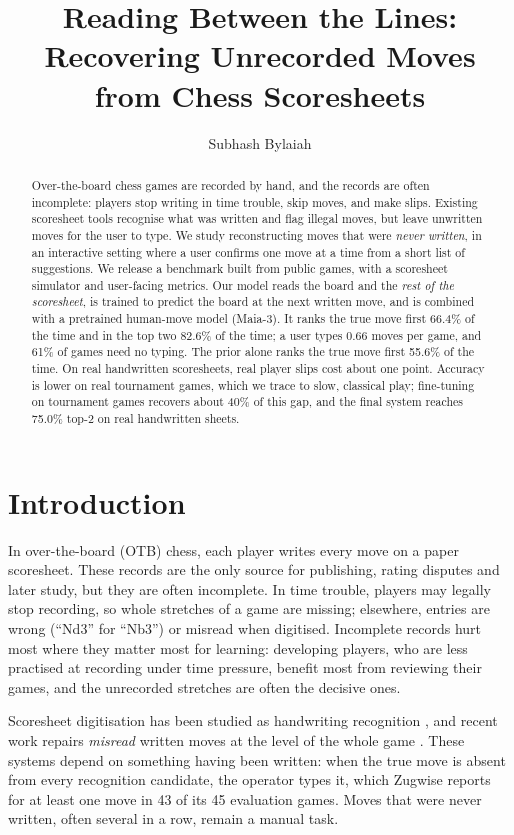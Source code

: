 \documentclass[11pt]{article}
\title{Reading Between the Lines:\\Recovering Unrecorded Moves from Chess Scoresheets}
\author{Subhash Bylaiah}
\date{}
\begin{document}
\maketitle

\begin{abstract}
Over-the-board chess games are recorded by hand, and the records are often incomplete: players stop writing in time trouble, skip moves, and make slips. Existing scoresheet tools recognise what was written and flag illegal moves, but leave unwritten moves for the user to type.
We study reconstructing moves that were \emph{never written}, in an interactive setting where a user confirms one move at a time from a short list of suggestions.
We release a benchmark built from public games, with a scoresheet simulator and user-facing metrics.
Our model reads the board and the \emph{rest of the scoresheet}, is trained to predict the board at the next written move, and is combined with a pretrained human-move model (Maia-3). It ranks the true move first 66.4\% of the time and in the top two 82.6\% of the time; a user types 0.66 moves per game, and 61\% of games need no typing. The prior alone ranks the true move first 55.6\% of the time.
On real handwritten scoresheets, real player slips cost about one point. Accuracy is lower on real tournament games, which we trace to slow, classical play; fine-tuning on tournament games recovers about 40\% of this gap, and the final system reaches 75.0\% top-2 on real handwritten sheets.
\end{abstract}

\section{Introduction}

In over-the-board (OTB) chess, each player writes every move on a paper scoresheet. These records are the only source for publishing, rating disputes and later study, but they are often incomplete. In time trouble, players may legally stop recording, so whole stretches of a game are missing; elsewhere, entries are wrong (``Nd3'' for ``Nb3'') or misread when digitised. Incomplete records hurt most where they matter most for learning: developing players, who are less practised at recording under time pressure, benefit most from reviewing their games, and the unrecorded stretches are often the decisive ones.

Scoresheet digitisation has been studied as handwriting recognition \citep{eicher2021hcs,majid2022digitization,hayashi2022attention}, and recent work repairs \emph{misread} written moves at the level of the whole game \citep{trippen2026zugwise}. These systems depend on something having been written: when the true move is absent from every recognition candidate, the operator types it, which Zugwise reports for at least one move in 43 of its 45 evaluation games. Moves that were never written, often several in a row, remain a manual task.
\end{document}
